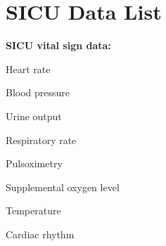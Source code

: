 \documentclass{sig-alternate}
\begin{document}
\vspace{10pt}

\vspace{10pt}
\appendix
\section{SICU Data List}
\label{app:sicu_data}

\noindent \textbf{SICU vital sign data:}
\begin{itemize*}
  \item Heart rate \vspace{3pt}
  \item Blood pressure \vspace{3pt}
  \item Urine output \vspace{3pt}
  \item Respiratory rate \vspace{3pt}
  \item Pulsoximetry \vspace{3pt}
  \item Supplemental oxygen level \vspace{3pt}
  \item Temperature \vspace{3pt}
  \item Cardiac rhythm \vspace{20pt}
\end{itemize*}
\end{document}
